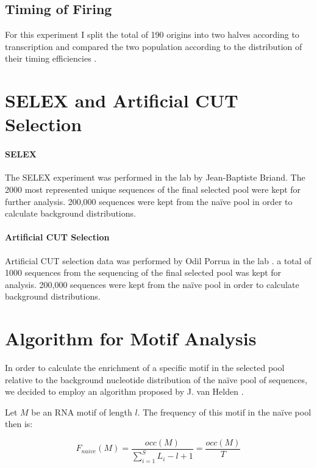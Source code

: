 \subsection*{Timing of Firing}

For this experiment I split the total of 190 origins into two halves according to transcription and compared the two population according to the distribution of their timing efficiencies .

\section*{SELEX and Artificial CUT Selection}

\paragraph{SELEX}
The SELEX experiment was performed in the lab by Jean-Baptiste Briand.
The 2000 most represented unique sequences of the final selected pool were kept for further analysis.
200,000 sequences were kept from the na\"{i}ve pool in order to calculate background distributions.

\paragraph{Artificial CUT Selection}
Artificial CUT selection data was performed by Odil Porrua in the lab \cite{porrua:2012:in}.
a total of 1000 sequences from the sequencing of the final selected pool was kept for analysis.
200,000 sequences were kept from the na\"{i}ve pool in order to calculate background distributions.



\section*{Algorithm for Motif Analysis}

In order to calculate the enrichment of a specific motif in the selected pool relative to the background nucleotide distribution of the na\"{i}ve pool of sequences, we decided to employ an algorithm proposed by J. van Helden \cite{vanhelden:1998:extracting}. 
 
Let $M$ be an RNA motif of length $l$. The frequency of this motif in the na\"{i}ve pool then is:

\begin{equation} \label{feaf}
F_{naive}(M)  =\dfrac{occ(M)}{\sum_{i=1}^{S} L_i - l + 1} = \dfrac{occ(M)}{T}
\end{equation}

